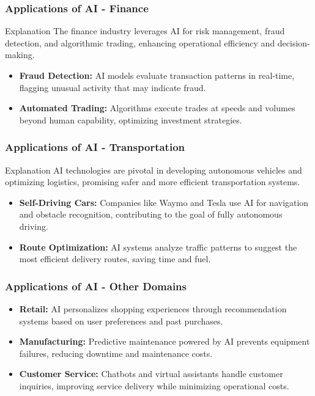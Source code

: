 \documentclass[aspectratio=169]{beamer}
\begin{document}
\begin{frame}[fragile]
    \frametitle{Applications of AI - Finance}
    \begin{block}{Explanation}
        The finance industry leverages AI for risk management, fraud detection, and algorithmic trading, enhancing operational efficiency and decision-making.
    \end{block}
    
    \begin{itemize}
        \item \textbf{Fraud Detection:} 
        AI models evaluate transaction patterns in real-time, flagging unusual activity that may indicate fraud.
        
        \item \textbf{Automated Trading:} 
        Algorithms execute trades at speeds and volumes beyond human capability, optimizing investment strategies.
    \end{itemize}
\end{frame}

\begin{frame}[fragile]
    \frametitle{Applications of AI - Transportation}
    \begin{block}{Explanation}
        AI technologies are pivotal in developing autonomous vehicles and optimizing logistics, promising safer and more efficient transportation systems.
    \end{block}
    
    \begin{itemize}
        \item \textbf{Self-Driving Cars:} 
        Companies like Waymo and Tesla use AI for navigation and obstacle recognition, contributing to the goal of fully autonomous driving.
        
        \item \textbf{Route Optimization:} 
        AI systems analyze traffic patterns to suggest the most efficient delivery routes, saving time and fuel.
    \end{itemize}
\end{frame}

\begin{frame}[fragile]
    \frametitle{Applications of AI - Other Domains}
    \begin{itemize}
        \item \textbf{Retail:} 
        AI personalizes shopping experiences through recommendation systems based on user preferences and past purchases.
        
        \item \textbf{Manufacturing:} 
        Predictive maintenance powered by AI prevents equipment failures, reducing downtime and maintenance costs.
        
        \item \textbf{Customer Service:} 
        Chatbots and virtual assistants handle customer inquiries, improving service delivery while minimizing operational costs.
    \end{itemize}
\end{frame}
\end{document}
